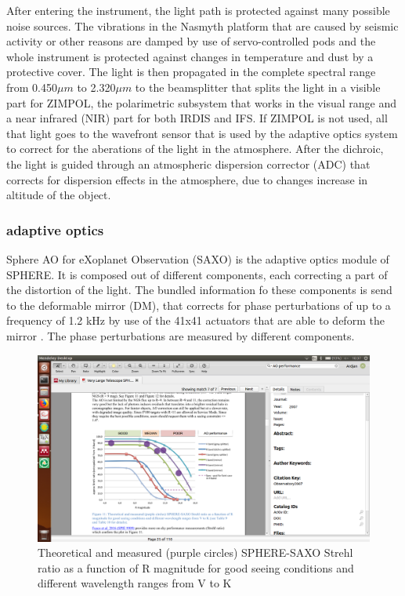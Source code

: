 \documentclass[twoside,single]{lion-msc}
\begin{document}
After entering the instrument, the light path is protected against many possible noise sources. The vibrations in the Nasmyth platform that are caused by seismic activity or other reasons are damped by use of servo-controlled pods and the whole instrument is protected against changes in temperature and dust by a protective cover. The light is then propagated in the complete spectral range from 0.450$\mu m$ to 2.320$\mu m$ to the beamsplitter that splits the light in a visible part for ZIMPOL, the polarimetric subsystem that works in the visual range and a near infrared (NIR) part for both IRDIS and IFS. If ZIMPOL is not used, all that light goes to the wavefront sensor that is used by the adaptive optics system to correct for the aberations of the light in the atmosphere. After the dichroic, the light is guided through an atmospheric dispersion corrector (ADC) that corrects for dispersion effects in the atmosphere, due to changes increase in altitude of the object.
\bigskip

\subsubsection{adaptive optics}
Sphere AO for eXoplanet Observation (SAXO) is the adaptive optics module of SPHERE. It is composed out of different components, each correcting a part of the distortion of the light. The bundled information fo these components is send to the deformable mirror (DM), that corrects for phase perturbations of up to a frequency of 1.2 kHz by use of the 41x41 actuators that are able to deform the mirror \citep{Observatory2007}. The phase perturbations are measured by different components.
\bigskip

\begin{figure}[htbp]
\centering
\includegraphics[trim={7cm 4.5cm 19cm 10cm},clip,width = 1\textwidth]{aoperformance}
\caption{Theoretical and measured (purple circles) SPHERE-SAXO Strehl ratio as a function of R magnitude for good seeing conditions and different wavelength ranges from V to K\citep{Observatory2007}}
\label{fig:aoperformance}
\end{figure}
\end{document}
